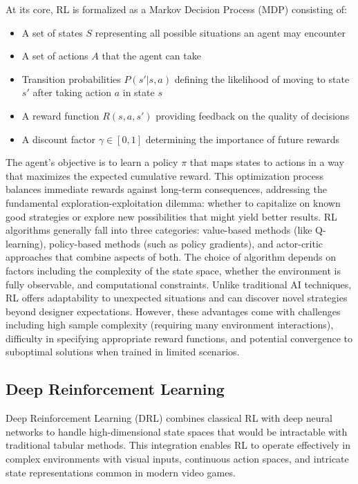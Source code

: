 At its core, RL is formalized as a Markov Decision Process (MDP) consisting of:
\begin{itemize}
    \item A set of states $S$ representing all possible situations an agent may encounter
    \item A set of actions $A$ that the agent can take
    \item Transition probabilities $P(s'|s,a)$ defining the likelihood of moving to state $s'$ after taking action $a$ in state $s$
    \item A reward function $R(s,a,s')$ providing feedback on the quality of decisions
    \item A discount factor $\gamma \in [0,1]$ determining the importance of future rewards
\end{itemize}

The agent's objective is to learn a policy $\pi$ that maps states to actions in a way that maximizes the expected cumulative reward. 
This optimization process balances immediate rewards against long-term consequences, addressing the fundamental exploration-exploitation dilemma: whether to capitalize on known good strategies or explore new possibilities that might yield better results.
RL algorithms generally fall into three categories: value-based methods (like Q-learning), policy-based methods (such as policy gradients), and actor-critic approaches that combine aspects of both. 
The choice of algorithm depends on factors including the complexity of the state space, whether the environment is fully observable, and computational constraints.
Unlike traditional AI techniques, RL offers adaptability to unexpected situations and can discover novel strategies beyond designer expectations. 
However, these advantages come with challenges including high sample complexity (requiring many environment interactions), difficulty in specifying appropriate reward functions, and potential convergence to suboptimal solutions when trained in limited scenarios.

\subsection{Deep Reinforcement Learning}

Deep Reinforcement Learning (DRL) combines classical RL with deep neural networks to handle high-dimensional state spaces that would be intractable with traditional tabular methods. 
This integration enables RL to operate effectively in complex environments with visual inputs, continuous action spaces, and intricate state representations common in modern video games.


